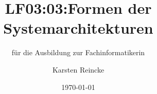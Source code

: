 \documentclass[]{beamer}
\title{LF03:03:Formen der Systemarchitekturen}
\subtitle{für die Ausbildung zur Fachinformatikerin}
\institute[GS-LDK]{Gewerbliche Schulen Dillenburg}
\author{Karsten Reincke}
\date{\today}
\def\cfgGl{../../../cfg.gl/}
\begin{document}

\begin{frame}
  \titlepage

  
\end{frame}






\logo{}
\newpage



%
\end{document}
